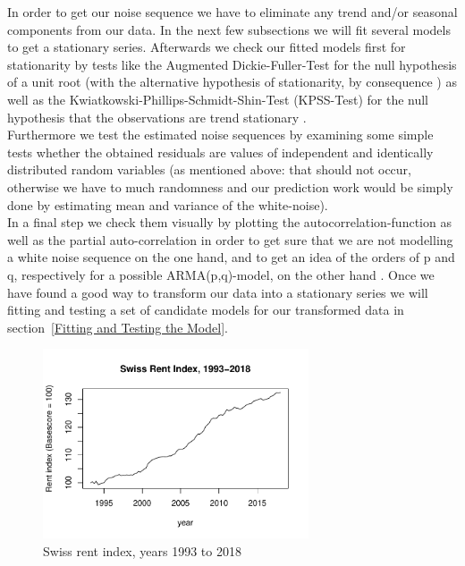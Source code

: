 \documentclass[11pt,a4paper]{article}
\begin{document}
In order to get our noise sequence we have to eliminate any trend and/or seasonal components from our data. In the next few subsections we will fit several models to get a stationary series. Afterwards we check our fitted models first for stationarity by tests like the Augmented Dickie-Fuller-Test for the null hypothesis of a unit root (with the alternative hypothesis of stationarity, by consequence \citep{adf}) as well as the Kwiatkowski-Phillips-Schmidt-Shin-Test (KPSS-Test) for the null hypothesis that the observations are trend stationary \citep{kpss92}. \\
Furthermore we test the estimated noise sequences by examining some simple tests 
whether the obtained residuals are values of independent and identically distributed random variables (as mentioned above: that should not occur, otherwise we have to much randomness and our prediction work would be simply done by estimating mean and variance of the white-noise). \\
In a final step we check them visually by plotting the autocorrelation-function as well as the partial auto-correlation in order to get sure that we are not modelling a white noise sequence on the one hand, and to get an idea of the orders of p and q, respectively for a possible ARMA(p,q)-model, on the other hand \cite[pp.~83--110]{bd02}.
Once we have found a good way to transform our data into a stationary series we will fitting and testing a set of candidate models for our transformed data in section~\ref{Fitting and Testing the Model}.
\\
\begin{figure}[!ht]
\centering
\includegraphics[angle=0,
width=0.7\textwidth]{indiceloyers_timeseries}
\caption{Swiss rent index, years 1993 to 2018\label{fig:indiceloyers_timeseries}}
\end{figure}
\end{document}
